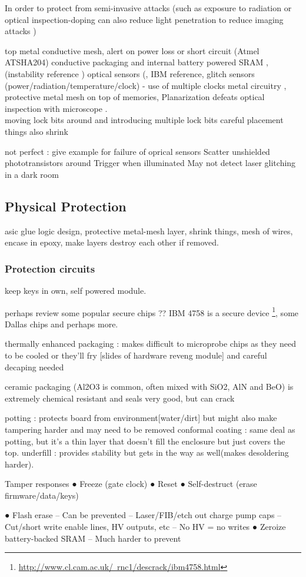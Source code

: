 In order to protect from semi-invasive attacks (such as exposure to radiation or optical inspection-doping can also reduce light penetration to reduce imaging attacks \citep{sergei:thesis})

top metal conductive mesh, alert on power loss or short circuit (Atmel ATSHA204) 
conductive packaging and internal battery powered SRAM ,(instability reference \citep{anderson:cautionary_note}) optical sensors (\citep{sergei:thesis}, IBM reference, \citep{hwre}
glitch sensors (power/radiation/temperature/clock) - use of multiple clocks
metal circuitry ,
protective metal mesh on top of memories, 
Planarization defeats optical inspection with microscope \citep{sergei:thesis}.\\
moving lock bits around and introducing multiple lock bits\citep{sergei:thesis} careful placement \citep{hwre}
things also shrink

not perfect : give example for failure of oprical sensors
Scatter unshielded phototransistors around
Trigger when illuminated
May not detect laser glitching in a dark room

\subsection{Physical Protection}
asic glue logic design, protective metal-mesh layer, shrink things, mesh of wires, encase in epoxy, make layers destroy each other if removed. 
\subsubsection{Protection circuits}
 keep keys in own, self powered module.
	
	perhaps review some popular secure chips ?? IBM 4758 is a secure device \footnote{\href{http://www.cl.cam.ac.uk/~rnc1/descrack/ibm4758.html}{http://www.cl.cam.ac.uk/~rnc1/descrack/ibm4758.html}}, some Dallas chips and perhaps more.
	
	thermally enhanced packaging : makes difficult to microprobe chips as they need to be cooled or they'll fry [slides of hardware reveng module] and careful decaping needed
	
	ceramic packaging (Al2O3 is common, often mixed with SiO2, AlN and BeO) is extremely chemical resistant and seals very good, but can crack
	
	potting : protects board from environment[water/dirt] but might also make tampering harder and may need to be removed
	conformal coating : same deal as potting, but it's a thin layer that doesn't fill the enclosure but just covers the top.
	underfill : provides stability but gets in the way as well(makes desoldering harder).


Tamper responses
● Freeze (gate clock)
● Reset
● Self-destruct (erase firmware/data/keys)

● Flash erase
– Can be prevented
– Laser/FIB/etch out charge pump caps
– Cut/short write enable lines, HV outputs, etc
– No HV = no writes
● Zeroize battery-backed SRAM
– Much harder to prevent